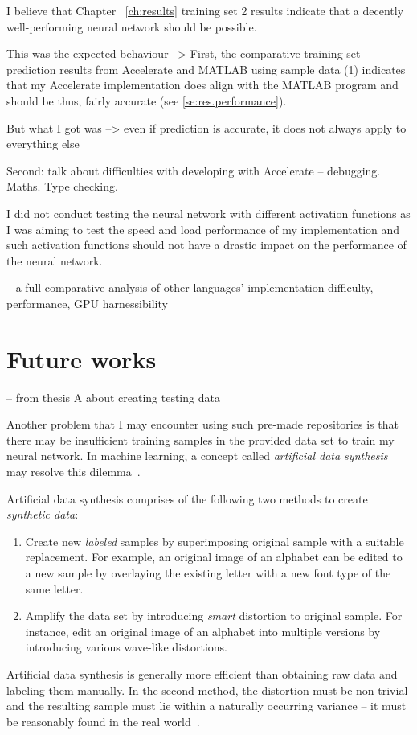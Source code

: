 I believe that Chapter ~\ref{ch:results} training set 2 results indicate that a decently well-performing neural network should be possible.


This was the expected behaviour --> First, the comparative training set prediction results from Accelerate and MATLAB using sample data (1) indicates that my Accelerate implementation does align with the MATLAB program and should be thus, fairly accurate (see \ref{se:res.performance}).

But what I got was --> even if prediction is accurate, it does not always apply to everything else

Second: talk about difficulties with developing with Accelerate -- debugging. Maths. Type checking.

I did not conduct testing the neural network with different activation functions as I was aiming to test the speed and load performance of my implementation and such activation functions should not have a drastic impact on the performance of the neural network.

-- a full comparative analysis of other languages' implementation difficulty, performance, GPU harnessibility

\section{Future works} \label{se:eval.future}



-- from thesis A about creating testing data

Another problem that I may encounter using such pre-made repositories is that there may be insufficient training samples in the provided data set to train my neural network. In machine learning, a concept called \textit{artificial data synthesis} may resolve this dilemma~\cite{Ng12}. 

Artificial data synthesis comprises of the following two methods to create \textit{synthetic data}: 
\begin{enumerate}
\item Create new \textit{labeled} samples by superimposing original sample with a suitable replacement. For example, an original image of an alphabet can be edited to a new sample by overlaying the existing letter with a new font type of the same letter.
\item Amplify the data set by introducing \textit{smart} distortion to original sample. For instance, edit an original image of an alphabet into multiple versions by introducing various wave-like distortions.
\end{enumerate}

Artificial data synthesis is generally more efficient than obtaining raw data and labeling them manually. In the second method, the distortion must be non-trivial and the resulting sample must lie within a naturally occurring variance -- it must be reasonably found in the real world~\cite{Ng12}.
